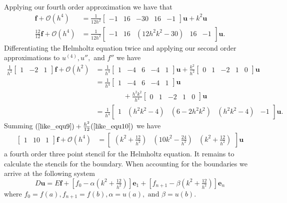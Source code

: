 \documentclass[12pt]{article}
\newcommand{\bigO}{\mathcal{O}}
\renewcommand{\vec}[1]{\boldsymbol{\mathbf{#1}}}
\begin{document}
Applying our fourth order approximation we have that
\begin{align}
	\vec{f} + \bigO(h^4) &= \frac{1}{12h^2}\begin{bmatrix} -1 & 16 & -30 & 16 & -1 \end{bmatrix}\vec{u} + k^2 \vec{u} \nonumber \\
	\frac{12}{12}\vec{f} + \bigO(h^4)&= \frac{1}{12h^2}\begin{bmatrix} -1 & 16 & (12h^2k^2-30) & 16 & -1 \end{bmatrix}\vec{u}\text{.} \label{like_equ9}
\end{align}
Differentiating the Helmholtz equation twice and applying our second order approximations to $u^{(4)}, u'',$ and $f''$ we have
\begin{align}
 \frac{1}{h^2}\begin{bmatrix} 1 & -2 & 1 \end{bmatrix}\vec{f} + \bigO(h^2) &= \frac{1}{h^4}\begin{bmatrix} 1 & -4 & 6 & -4 & 1 \end{bmatrix}\vec{u} +  \frac{k^2}{h^2}\begin{bmatrix} 0 & 1 & -2 & 1 & 0 \end{bmatrix}\vec{u} \nonumber \\
&= \frac{1}{h^4}\begin{bmatrix} 1 & -4 & 6 & -4 & 1 \end{bmatrix}\vec{u} \nonumber \\
	& \phantom{===} +   \frac{h^2k^2}{h^4}\begin{bmatrix} 0 & 1 & -2 & 1 & 0 \end{bmatrix}\vec{u} \nonumber \\
&= \frac{1}{h^4}\begin{bmatrix} 1 & (h^2k^2-4) & (6-2h^2k^2) & (h^2k^2-4) & -1 \end{bmatrix}\vec{u}\text{.} \label{like_equ10}
\end{align}
Summing $(\ref{like_equ9}) + \frac{h^2}{12} (\ref{like_equ10})$ we have
\begin{align*}
	\begin{bmatrix} 1 & 10 & 1 \end{bmatrix}\vec{f} + \bigO(h^4) &= \begin{bmatrix} (k^2+\frac{12}{h^2}) & (10k^2-\frac{24}{h^2}) & (k^2+\frac{12}{h^2})\end{bmatrix}\vec{u}
\end{align*}
a fourth order three point stencil for the Helmholtz equation. It remains to calculate the stencils for the boundary. When accounting for the boundaries we arrive at the following system
$$
D\vec{u} = E\vec{f} + \left[f_0 - \alpha(k^2+\tfrac{12}{h^2}) \right] \vec{e}_1 + \left[f_{n+1} - \beta(k^2+\tfrac{12}{h^2}) \right] \vec{e}_{n}
$$
where $f_0=f(a), f_{n+1}=f(b), \alpha = u(a), \text{ and }\beta=u(b)$. 
\end{document}
